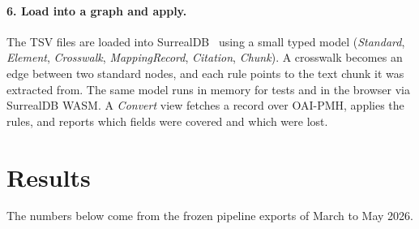\documentclass[10pt,twocolumn,a4paper]{extarticle}
\begin{document}
\paragraph{6. Load into a graph and apply.} The TSV files are loaded into
SurrealDB~\cite{surrealdb} using a small typed model (\emph{Standard}, \emph{Element},
\emph{Crosswalk}, \emph{MappingRecord}, \emph{Citation}, \emph{Chunk}).
A crosswalk becomes an edge between two standard nodes, and each rule points
to the text chunk it was extracted from. The same model runs in memory for
tests and in the browser via SurrealDB WASM. A \emph{Convert} view fetches
a record over OAI-PMH, applies the rules, and reports which fields were
covered and which were lost.

\section{Results}\label{sec:results}

The numbers below come from the frozen pipeline exports of March to May 2026.
\end{document}
